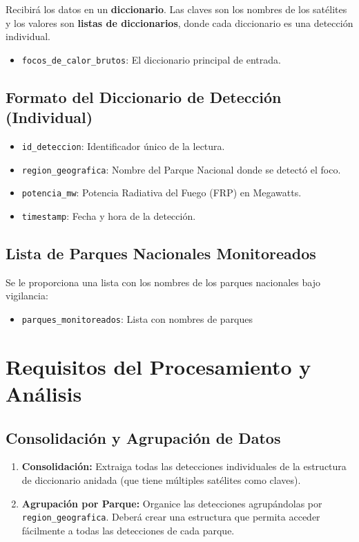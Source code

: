 \documentclass[11pt,a4paper]{article}
\begin{document}
Recibirá los datos en un \textbf{diccionario}. Las claves son los nombres de los satélites y los valores son \textbf{listas de diccionarios}, donde cada diccionario es una detección individual.

\begin{itemize}[leftmargin=*]
    \item \texttt{focos\_de\_calor\_brutos}: El diccionario principal de entrada.
\end{itemize}

\subsection{Formato del Diccionario de Detección (Individual)}

\begin{itemize}[leftmargin=*]
    \item \texttt{id\_deteccion}: Identificador único de la lectura.
    \item \texttt{region\_geografica}: Nombre del Parque Nacional donde se detectó el foco.
    \item \texttt{potencia\_mw}: Potencia Radiativa del Fuego (FRP) en Megawatts.
    \item \texttt{timestamp}: Fecha y hora de la detección.
\end{itemize}

\subsection{Lista de Parques Nacionales Monitoreados}

Se le proporciona una lista con los nombres de los parques nacionales bajo vigilancia:

\begin{itemize}[leftmargin=*]
    \item \texttt{parques\_monitoreados}: Lista con nombres de parques
\end{itemize}

\section{Requisitos del Procesamiento y Análisis}

\subsection{Consolidación y Agrupación de Datos}

\begin{enumerate}[leftmargin=*]
    \item \textbf{Consolidación:} Extraiga todas las detecciones individuales de la estructura de diccionario anidada (que tiene múltiples satélites como claves).
    
    \item \textbf{Agrupación por Parque:} Organice las detecciones agrupándolas por \texttt{region\_geografica}. Deberá crear una estructura que permita acceder fácilmente a todas las detecciones de cada parque.
\end{enumerate}
\end{document}
